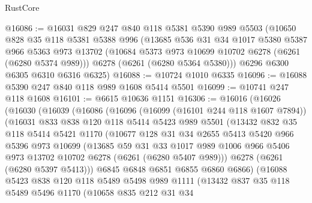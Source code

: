 \begin{lexlean}{RustCore}
\begin{coremodule}
@16086 := @16031
    @829
    @247
    @840
    @118
    @5381
    @5390
    @989
    @5503
    (@10650
      @828
      @35
      @118
      @5381
      @5388
      @996
      (@13685
        @536
        @31
        @34
        @1017
        @5380
        @5387
        @966
        @5363
        @973
        @13702
        (@10684 @5373 @973 @10699 @10702 @6278 (@6261 (@6280 @5374 @989)))
        @6278
        (@6261 (@6280 @5364 @5380)))
      @6296
      @6300
      @6305
      @6310
      @6316
      @6325)
@16088 := @10724 @1010 @6335
@16096 := @16088 @5390 @247 @840 @118 @989 @1608 @5414 @5501
@16099 := @10741 @247 @118 @1608
@16101 := @6615 @10636 @1151
@16306 := @16016
    (@16026
      (@16030
        (@16039
          (@16086
            (@16096
              (@16099 (@16101 @244 @118 @1607 @7894))
              (@16031
                @833
                @838
                @120
                @118
                @5414
                @5423
                @989
                @5501
                (@13432
                  @832
                  @35
                  @118
                  @5414
                  @5421
                  @1170
                  (@10677
                    @128
                    @31
                    @34
                    @2655
                    @5413
                    @5420
                    @966
                    @5396
                    @973
                    @10699
                    (@13685
                      @59
                      @31
                      @33
                      @1017
                      @989
                      @1006
                      @966
                      @5406
                      @973
                      @13702
                      @10702
                      @6278
                      (@6261 (@6280 @5407 @989)))
                    @6278
                    (@6261 (@6280 @5397 @5413)))
                  @6845
                  @6848
                  @6851
                  @6855
                  @6860
                  @6866)
                (@16088
                  @5423
                  @838
                  @120
                  @118
                  @5489
                  @5498
                  @989
                  @1111
                  (@13432
                    @837
                    @35
                    @118
                    @5489
                    @5496
                    @1170
                    (@10658
                      @835
                      @212
                      @31
                      @34

\end{coremodule}
\end{lexlean}
